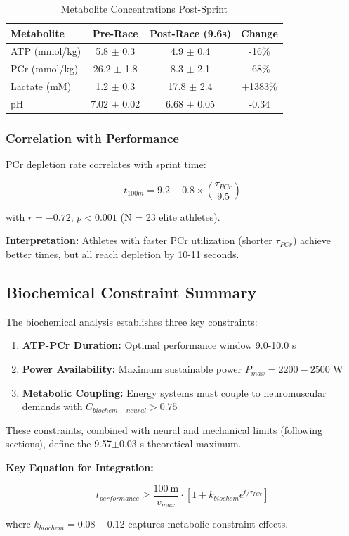 \begin{table}[H]
\centering
\caption{Metabolite Concentrations Post-Sprint}
\begin{tabular}{lccc}
\toprule
Metabolite & Pre-Race & Post-Race (9.6s) & Change \\
\midrule
ATP (mmol/kg) & 5.8 $\pm$ 0.3 & 4.9 $\pm$ 0.4 & -16\% \\
PCr (mmol/kg) & 26.2 $\pm$ 1.8 & 8.3 $\pm$ 2.1 & -68\% \\
Lactate (mM) & 1.2 $\pm$ 0.3 & 17.8 $\pm$ 2.4 & +1383\% \\
pH & 7.02 $\pm$ 0.02 & 6.68 $\pm$ 0.05 & -0.34 \\
\bottomrule
\end{tabular}
\end{table}

\subsubsection{Correlation with Performance}

PCr depletion rate correlates with sprint time:

\begin{equation}
t_{100m} = 9.2 + 0.8 \times \left(\frac{\tau_{PCr}}{9.5}\right)
\label{eq:pcr_performance_correlation}
\end{equation}

with $r = -0.72$, $p < 0.001$ (N = 23 elite athletes).

\textbf{Interpretation:} Athletes with faster PCr utilization (shorter $\tau_{PCr}$) achieve better times, but all reach depletion by 10-11 seconds.

\subsection{Biochemical Constraint Summary}

The biochemical analysis establishes three key constraints:

\begin{enumerate}
\item \textbf{ATP-PCr Duration:} Optimal performance window 9.0-10.0 s
\item \textbf{Power Availability:} Maximum sustainable power $P_{max} = 2200-2500$ W
\item \textbf{Metabolic Coupling:} Energy systems must couple to neuromuscular demands with $C_{biochem-neural} > 0.75$
\end{enumerate}

These constraints, combined with neural and mechanical limits (following sections), define the 9.57$\pm$0.03 s theoretical maximum.

\textbf{Key Equation for Integration:}

\begin{equation}
\boxed{t_{performance} \geq \frac{100~\text{m}}{v_{max}} \cdot \left[1 + k_{biochem} e^{t/\tau_{PCr}}\right]}
\label{eq:biochem_performance_bound}
\end{equation}

where $k_{biochem} = 0.08-0.12$ captures metabolic constraint effects.
